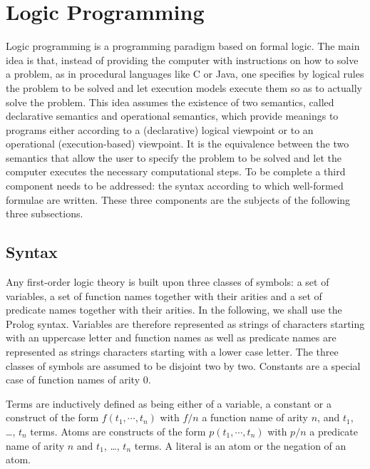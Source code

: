 \section{Logic Programming}
\label{appendix-lp}

Logic programming is a programming paradigm based on formal logic. The main idea is that, instead of providing the computer with instructions on how to solve a problem, as in procedural languages like C or Java, one specifies by logical rules the problem to be solved and let execution models execute them so as to actually solve the problem. This idea assumes the existence of two semantics, called declarative semantics and operational semantics, which provide meanings to programs either according to a (declarative) logical viewpoint or to an operational (execution-based) viewpoint. It is the equivalence between the two semantics that allow the user to specify the problem to be solved and let the computer executes the necessary computational steps. To be complete a third component needs to be addressed: the syntax according to which well-formed formulae are written. These three components are the subjects of the following
three subsections.

\subsection{Syntax}

Any first-order logic theory is built upon three classes of symbols: a set of variables, a set of function names together with their arities
and a set of predicate names together with their arities. In the following, we shall use the Prolog syntax. Variables are therefore represented as strings of characters starting with an uppercase letter
and function names as well as predicate names are represented as strings characters starting with a lower case letter.
The three classes of symbols are assumed to be disjoint two by two. Constants are a special case of function names of arity
$0$.

Terms are inductively defined as being either of a variable, a constant or a construct of the form $f(t_1,\cdots,t_n)$ with $f/n$ a function name of arity $n$, and $t_1$, \ldots, $t_n$ terms. 
Atoms are constructs of the form $p(t_1,\cdots,t_n)$ with $p/n$ a predicate name of arity $n$ and $t_1$, \ldots, $t_n$ terms. A
literal is an atom or the negation of an atom.


